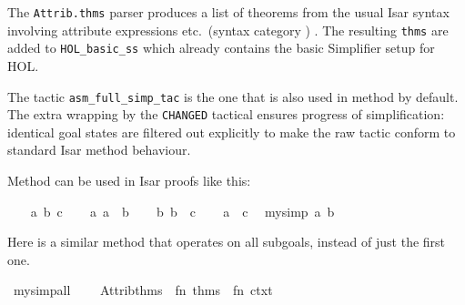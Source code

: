 \begin{isabellebody}
\begin{isamarkuptext}
  The \verb|Attrib.thms| parser produces a list of theorems from the
  usual Isar syntax involving attribute expressions etc.\ (syntax
  category \hyperlink{syntax.thmrefs}{\mbox{}}) \cite{isabelle-isar-ref}.  The resulting
  \verb|thms| are added to \verb|HOL_basic_ss| which already
  contains the basic Simplifier setup for HOL.

  The tactic \verb|asm_full_simp_tac| is the one that is also used in
  method \hyperlink{method.simp}{\mbox{}} by default.  The extra wrapping by the \verb|CHANGED| tactical ensures progress of simplification: identical goal
  states are filtered out explicitly to make the raw tactic conform to
  standard Isar method behaviour.

  \medskip Method \hyperlink{method.my-simp}{\mbox{}} can be used in Isar proofs like
  this:%
\end{isamarkuptext}%
\isamarkuptrue%
\isamarkupfalse%
\isanewline
{}\isanewline
%
\isadelimproof
\ \ %
\endisadelimproof
%
\isatagproof
{}\isamarkupfalse%
\ a\ b\ c\isanewline
\ \ \isamarkupfalse%
\ a{}\ {}a\ {}\ b{}\isanewline
\ \ \isamarkupfalse%
\ b{}\ {}b\ {}\ c{}\isanewline
\ \ \isamarkupfalse%
\ {}a\ {}\ c{}\ \isamarkupfalse%
\ {}my{}simp\ a\ b{}%
\endisatagproof
{\isafoldproof}%
%
\isadelimproof
\isanewline
%
\endisadelimproof
{}\isamarkupfalse%
%
\begin{isamarkuptext}%
Here is a similar method that operates on all subgoals,
  instead of just the first one.%
\end{isamarkuptext}%
\isamarkuptrue%
%
\isadelimML
%
\endisadelimML
%
\isatagML
{}\isamarkupfalse%
\ my{}simp{}all\ {}\ {}\isanewline
\ \ Attrib{}thms\ {}{}\ {}fn\ thms\ {}{}\ fn\ ctxt\ {}{}\isanewline

\end{isabellebody}
